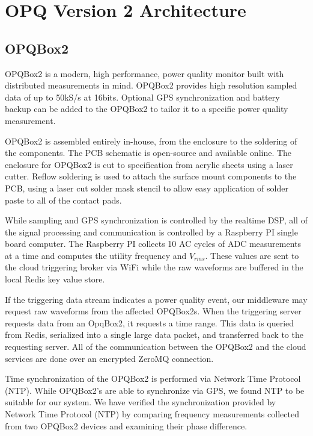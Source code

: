 \documentclass[a4paper, conference]{IEEEtran}
\begin{document}
\section{OPQ Version 2 Architecture}
\subsection{OPQBox2}
OPQBox2 is a modern, high performance, power quality monitor built with distributed measurements in mind. OPQBox2 provides high resolution sampled data of up to 50kS/s at 16bits. Optional GPS synchronization and battery backup can be added to the OPQBox2 to tailor it to a specific power quality measurement. 

OPQBox2 is assembled entirely in-house, from the enclosure to the soldering of the components. The PCB schematic is open-source and available online. The enclosure for OPQBox2 is cut to specification from acrylic sheets using a laser cutter. Reflow soldering is used to attach the surface mount components to the PCB, using a laser cut solder mask stencil to allow easy application of solder paste to all of the contact pads. 

While sampling and GPS synchronization is controlled by the realtime DSP, all of the signal processing and communication is controlled by a Raspberry PI single board computer. The Raspberry PI collects 10 AC cycles of ADC measurements at a time and computes the utility frequency and $V_{rms}$. These values are sent to the cloud triggering broker via WiFi while the raw waveforms are buffered in the local Redis key value store.


If the triggering data stream indicates a power quality event, our middleware may request raw waveforms from the affected OPQBox2s. When the triggering server requests data from an OpqBox2, it requests a time range. This data is queried from Redis, serialized into a single large data packet, and transferred back to the requesting server. All of the communication between the OPQBox2 and the cloud services are done over an encrypted ZeroMQ connection\cite{fengping2012distributed}.

Time synchronization of the OPQBox2 is performed via Network Time Protocol (NTP)\cite{mills1991internet}. While OPQBox2's are able to synchronize via GPS, we found NTP to be suitable for our system. We have verified the synchronization provided by Network Time Protocol (NTP) by comparing frequency measurements collected from two OPQBox2 devices and examining their phase difference.
\end{document}
